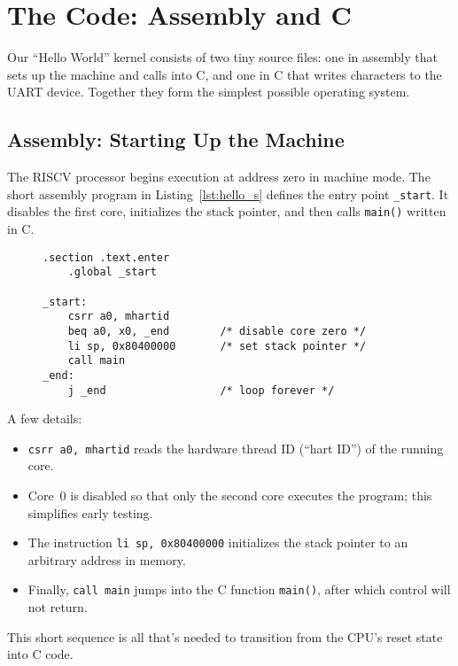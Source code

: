 \section{The Code: Assembly and C}

Our ``Hello World'' kernel consists of two tiny source files: one in assembly
that sets up the machine and calls into C, and one in C that writes characters
to the UART device.  Together they form the simplest possible operating system.

\subsection{Assembly: Starting Up the Machine}

The RISC\textendash V processor begins execution at address zero in machine
mode.  The short assembly program in Listing~\ref{lst:hello_s} defines the entry
point \texttt{\_start}.  It disables the first core, initializes the stack
pointer, and then calls \texttt{main()} written in C.

\begin{figure}[H]
\centering
\begin{minipage}{0.9\textwidth}
\begin{lstlisting}[style=oscode,language={[x86masm]Assembler},caption={Startup assembly for EmbryOS},label={lst:hello_s}]
    .section .text.enter
    .global _start

_start:
    csrr a0, mhartid
    beq a0, x0, _end        /* disable core zero */
    li sp, 0x80400000       /* set stack pointer */
    call main
_end:
    j _end                  /* loop forever */
\end{lstlisting}
\end{minipage}
\end{figure}

A few details:

\begin{itemize}
  \item \texttt{csrr a0, mhartid} reads the hardware thread ID (``hart ID'') of
        the running core.
  \item Core~0 is disabled so that only the second core executes the program;
        this simplifies early testing.
  \item The instruction \texttt{li sp, 0x80400000} initializes the stack
        pointer to an arbitrary address in memory.
  \item Finally, \texttt{call main} jumps into the C function
        \texttt{main()}, after which control will not return.
\end{itemize}

This short sequence is all that’s needed to transition from the CPU’s reset
state into C code.
